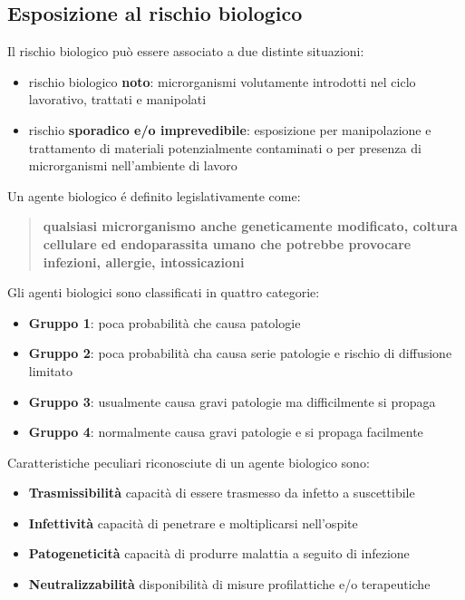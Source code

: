 \documentclass[a4paper]{article}
\begin{document}
\subsection{Esposizione al rischio biologico}
Il rischio biologico può essere associato a due distinte situazioni:
\begin{itemize}
    \item rischio biologico \textbf{noto}: microrganismi volutamente introdotti nel ciclo lavorativo, trattati e manipolati
    \item rischio \textbf{sporadico e/o imprevedibile}: esposizione per manipolazione e trattamento di materiali
    potenzialmente contaminati o per presenza di microrganismi nell’ambiente di lavoro 
\end{itemize}
Un agente biologico é definito legislativamente come:
\begin{quote}
    \centering
    \textbf{qualsiasi microrganismo anche geneticamente modificato, coltura cellulare ed endoparassita umano
    che potrebbe provocare infezioni, allergie, intossicazioni}
\end{quote}
Gli agenti biologici sono classificati in quattro categorie:
\begin{itemize}
    \item \textbf{Gruppo 1}: poca probabilità che causa patologie
    \item \textbf{Gruppo 2}: poca probabilità cha causa serie patologie e 
    rischio di diffusione limitato
    \item \textbf{Gruppo 3}: usualmente causa gravi patologie ma difficilmente si propaga
    \item \textbf{Gruppo 4}: normalmente causa gravi patologie e si propaga facilmente
\end{itemize}
Caratteristiche peculiari riconosciute di un agente biologico sono:
\begin{itemize}
    \item \textbf{Trasmissibilità} capacità di essere trasmesso da infetto a suscettibile
    \item \textbf{Infettività} capacità di penetrare e moltiplicarsi nell'ospite
    \item \textbf{Patogeneticità} capacità di produrre malattia a seguito di infezione
    \item \textbf{Neutralizzabilità} disponibilità di misure profilattiche e/o terapeutiche 
\end{itemize}
\end{document}

